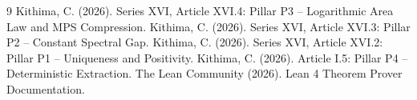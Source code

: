 \documentclass[11pt,a4paper]{article}
\begin{document}

\begin{thebibliography}{9}
  Kithima, C. (2026). Series XVI, Article XVI.4: Pillar P3 – Logarithmic Area Law and MPS Compression.
  Kithima, C. (2026). Series XVI, Article XVI.3: Pillar P2 – Constant Spectral Gap.
  Kithima, C. (2026). Series XVI, Article XVI.2: Pillar P1 – Uniqueness and Positivity.
  Kithima, C. (2026). Article I.5: Pillar P4 – Deterministic Extraction.
  The Lean Community (2026). Lean 4 Theorem Prover Documentation.
\end{thebibliography}
\end{document}
